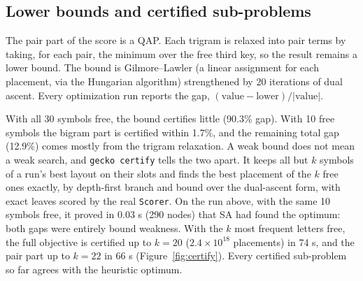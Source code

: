 \documentclass{gecko-paper}
\begin{document}
\begin{paperbody}
\subsection{Lower bounds and certified sub-problems}
The pair part of the score is a QAP. Each trigram is relaxed into pair terms by taking, for each pair, the minimum over the free third key, so the result remains a lower bound. The bound is Gilmore–Lawler (a linear assignment for each placement, via the Hungarian algorithm) strengthened by 20 iterations of dual ascent. Every optimization run reports the gap, $(\text{value}-\text{lower})/|\text{value}|$.


With all 30 symbols free, the bound certifies little (90.3\% gap). With 10 free symbols the bigram part is certified within 1.7\%, and the remaining total gap (12.9\%) comes mostly from the trigram relaxation. A weak bound does not mean a weak search, and \texttt{gecko certify} tells the two apart. It keeps all but $k$ symbols of a run's best layout on their slots and finds the best placement of the $k$ free ones exactly, by depth-first branch and bound over the dual-ascent form, with exact leaves scored by the real \texttt{Scorer}. On the run above, with the same 10 symbols free, it proved in 0.03 s (290 nodes) that SA had found the optimum: both gaps were entirely bound weakness. With the $k$ most frequent letters free, the full objective is certified up to $k=20$ ($2.4\times10^{18}$ placements) in 74 s, and the pair part up to $k=22$ in 66 s (Figure~\ref{fig:certify}). Every certified sub-problem so far agrees with the heuristic optimum.



\end{paperbody}
\end{document}
